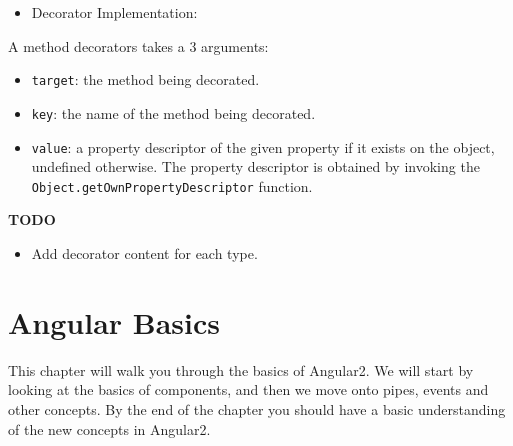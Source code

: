 \documentclass[12pt,]{article}
\newenvironment{Shaded}{}{}
\newcommand{\KeywordTok}[1]{\textcolor[rgb]{0.00,0.00,1.00}{{#1}}}
\newcommand{\FunctionTok}[1]{{#1}}
\newcommand{\NormalTok}[1]{{#1}}
\providecommand{\tightlist}{%
  \setlength{\itemsep}{0pt}\setlength{\parskip}{0pt}}
\begin{document}
\begin{itemize}
\tightlist
\item
  Decorator Implementation:
\end{itemize}

\begin{Shaded}
\end{Shaded}

A method decorators takes a 3 arguments:

\begin{itemize}
\tightlist
\item
  \texttt{target}: the method being decorated.
\item
  \texttt{key}: the name of the method being decorated.
\item
  \texttt{value}: a property descriptor of the given property if it
  exists on the object, undefined otherwise. The property descriptor is
  obtained by invoking the \texttt{Object.getOwnPropertyDescriptor}
  function.
\end{itemize}

\textbf{TODO}

\begin{itemize}
\tightlist
\item
  Add decorator content for each type.
\end{itemize}

\section{Angular Basics}\label{angular-basics}

This chapter will walk you through the basics of Angular2. We will start
by looking at the basics of components, and then we move onto pipes,
events and other concepts. By the end of the chapter you should have a
basic understanding of the new concepts in Angular2.
\end{document}
